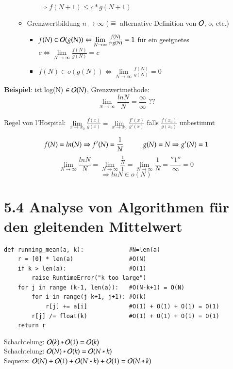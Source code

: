 \begin{itemize}
\begin{itemize}
\begin{enumerate}
                \hspace*{3cm} $\Rightarrow f(N+1) \leq c*g(N+1)$
            \end{enumerate}
            \item Grenzwertbildung $n \rightarrow \infty$ ($\widehat{=}$ alternative Definition von $\mathcal{O}{}$, o, etc.)
            \begin{itemize}[label={}]
                \item $f(N) \in \mathcal{O}{}(g(N)) \Leftrightarrow \lim\limits_{N \rightarrow \infty} \frac{f(N)}{c*g(N)} = 1$ für ein geeignetes $c \Leftrightarrow \lim\limits_{N \rightarrow \infty} \frac{f(N)}{g(N)} = c$
                \item $f(N) \in o(g(N)) \Leftrightarrow \lim\limits_{N \rightarrow \infty} \frac{f(N)}{g(N)} = 0$
            \end{itemize}
        \end{itemize}
    \end{itemize}

\textbf{Beispiel}: ist log(N) $\in \mathcal{O}{}(N)$, Grenzwertmethode:\\
\[\lim\limits_{N\rightarrow\infty} \frac{ln N}{N} = \frac{\infty}{\infty} \text{ ??} \]\\
Regel von l'Hospital: $\lim\limits_{x \rightarrow x_0} \frac{f(x)}{g(x)} = \lim\limits_{x \rightarrow x_0} \frac{f'(x)}{g'(x)}$ falls $\frac{f(x_0)}{g(x_0)}$ unbestimmt

\[f(N) = ln(N) \Rightarrow f'(N) = \frac{1}{N} \hspace*{1cm} g(N) = N \Rightarrow g'(N) = 1 \]
\[\lim_{N \rightarrow \infty} \frac{ln N}{N} = \lim_{N \rightarrow \infty} \frac{\frac{1}{N}}{1} = \lim_{N \rightarrow \infty} \frac{1}{N} =  \frac{''1''}{\infty} = 0  \]
\[ \Rightarrow ln N \in o(N) \]

\section*{5.4 Analyse von Algorithmen für den gleitenden Mittelwert}
\begin{verbatim}
def running_mean(a, k):             #N=len(a)
    r = [0] * len(a)                #O(N)
    if k > len(a):                  #O(1)
        raise RuntimeError("k too large")
    for j in range (k-1, len(a)):   #O(N-k+1) = O(N)
        for i in range(j-k+1, j+1): #O(k)
            r[j] += a[i]            #O(1) + O(1) + O(1) = O(1)
        r[j] /= float(k)            #O(1) + O(1) + O(1) = O(1)
    return r
\end{verbatim}
Schachtelung: $\mathcal{O}{}(k) * \mathcal{O}{}(1) = \mathcal{O}{}(k)$ \\
Schachtelung: $\mathcal{O}{}(N) * \mathcal{O}{}(k) = \mathcal{O}{}(N*k)$ \\
Sequenz:      $\mathcal{O}{}(N)+\mathcal{O}{}(1)+\mathcal{O}{}(N*k)+\mathcal{O}{}(1) = \mathcal{O}{}(N*k)$ \\

